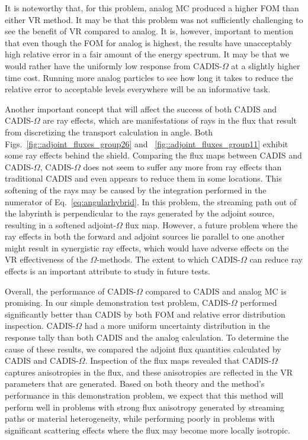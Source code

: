 \documentclass[12pt]{article}
\begin{document}
It is noteworthy that, for this problem, analog MC produced a higher FOM than either VR method. 
It may be that this problem was not sufficiently challenging to see the benefit of VR compared to analog. 
It is, however, important to mention that even though the FOM for analog is highest, the results have unacceptably high relative error in a fair amount of the energy spectrum. 
It may be that we would rather have the uniformly low response from CADIS-$\Omega$ at a slightly higher time cost.
Running more analog particles to see how long it takes to reduce the relative error to acceptable levels everywhere will be an informative task. 

Another important concept that will affect the success of both CADIS and CADIS-$\Omega$ are ray effects, which are manifestations of rays in the flux that result from discretizing the transport calculation in angle. Both Figs.~\ref{fig::adjoint_fluxes_group26} and ~\ref{fig::adjoint_fluxes_group11} exhibit some ray effects behind the shield. Comparing the flux maps between CADIS and  CADIS-$\Omega$, CADIS-$\Omega$ does not seem to suffer any more from ray effects than traditional CADIS and even appears to reduce them in some locations. This softening of the rays may be caused by the integration performed in the numerator of Eq.~\eqref{eq:angularhybrid}. In this problem, the streaming path out of the labyrinth is perpendicular to the rays generated by the adjoint source, resulting in a softened adjoint-$\Omega$ flux map. However, a future problem where the ray effects in both the forward and adjoint sources lie parallel to one another might result in synergistic ray effects, which would have adverse effects on the VR effectiveness of the $\Omega$-methods. The extent to which CADIS-$\Omega$ can reduce ray effects is an important attribute to study in future tests.

Overall, the performance of CADIS-$\Omega$ compared to CADIS and analog MC is promising. In our simple demonstration test problem, CADIS-$\Omega$ performed significantly better than CADIS by both FOM and relative error distribution inspection. CADIS-$\Omega$ had a more uniform uncertainty distribution in the response tally than both CADIS and the analog calculation. To determine the cause of these results, we compared the adjoint flux quantities calculated by CADIS and CADIS-$\Omega$. Inspection of the flux maps revealed that CADIS-$\Omega$ captures anisotropies in the flux, and these anisotropies are reflected in the VR parameters that are generated. Based on both theory and the method's performance in this demonstration problem, we expect that this method will perform well in problems with strong flux anisotropy generated by streaming paths or material heterogeneity, while performing poorly in problems with significant scattering effects where the flux may become more locally isotropic. 
 
\end{document}
